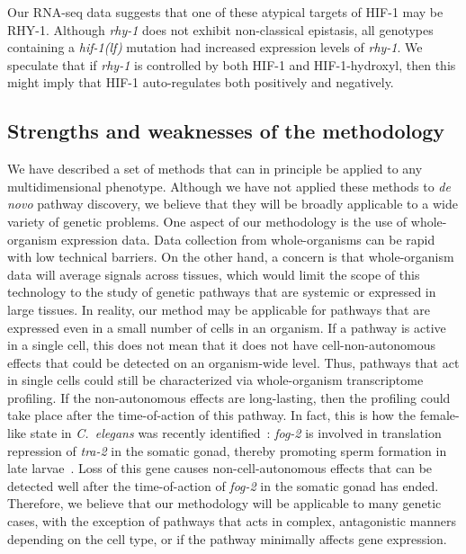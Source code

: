 \documentclass[9pt,twocolumn,twoside]{pnas-new}
\newcommand{\cel}{\emph{C.~elegans}}
\newcommand{\gene}[1]{\mbox{\emph{#1}}}
\newcommand{\hif}{\gene{hif-1(lf)}}
\newcommand{\rhyp}{RHY-1}
\newcommand{\hifp}{HIF-1}
\begin{document}
Our RNA-seq data suggests that one of these atypical targets of \hifp{} may be
\rhyp{}. Although \gene{rhy-1} does not exhibit non-classical epistasis, all
genotypes containing a \hif{} mutation had increased expression levels of
\gene{rhy-1}. We speculate that if \gene{rhy-1} is controlled by both \hifp{}
and \hifp{}-hydroxyl, then this might imply that \hifp{} auto-regulates both
positively and negatively.

\color{purple}
\subsection*{Strengths and weaknesses of the methodology}
We have described a set of methods that can in principle be applied to
any multidimensional phenotype. Although we have not applied these methods to
\emph{de novo} pathway discovery, we believe that they will be broadly
applicable to a wide variety of genetic problems. One aspect of our methodology
is the use of whole-organism expression data. Data collection from
whole-organisms can be rapid with low technical barriers. On the other
hand, a concern is that whole-organism data will average signals across tissues,
which would limit the scope of this technology to the study of genetic pathways
that are systemic or expressed in large tissues. In
reality, our method may be applicable for pathways that are expressed even in a
small number of cells in an organism. If a pathway is active in a single cell,
this does not mean that it does not have cell-non-autonomous effects that could
be detected on an organism-wide level. Thus,
pathways that act in single cells could still be
characterized via whole-organism transcriptome profiling. If the non-autonomous
effects are long-lasting, then the profiling could take place after the
time-of-action of this pathway. In fact, this is how the female-like state in
\cel{} was recently identified~\cite{Angeles-Albores2017a}: \gene{fog-2} is
involved in translation repression of \gene{tra-2} in the somatic gonad,
thereby promoting sperm formation in late larvae~\cite{Clifford2000}.
Loss of this gene causes non-cell-autonomous effects that can be detected well
after the time-of-action of \gene{fog-2} in the somatic gonad has ended.
Therefore, we believe that our methodology will be applicable to many
genetic cases, with the exception of pathways that
acts in complex, antagonistic manners depending on the cell type, or if
the pathway minimally affects gene expression.
\end{document}
